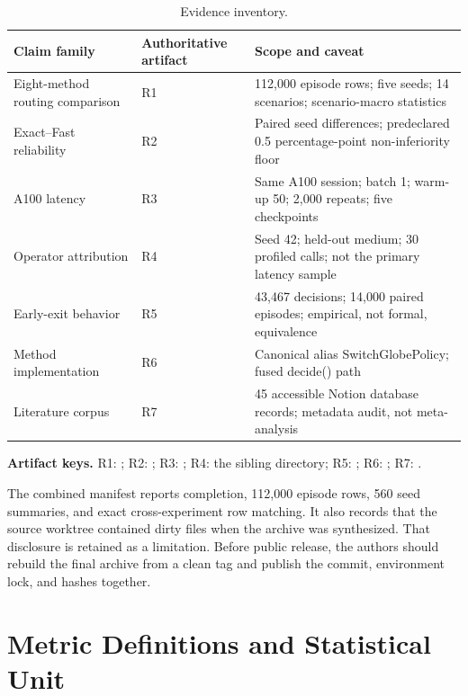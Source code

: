 \documentclass{ieeeaccess}
\begin{document}
\begin{table}[t]
\caption{Evidence inventory.}\label{tab:inventory}\small
\begin{tabularx}{\textwidth}{p{}p{}X}
\toprule
Claim family & Authoritative artifact & Scope and caveat \\
\midrule
Eight-method routing comparison & R1 & 112,000 episode rows; five seeds; 14 scenarios; scenario-macro statistics \\
Exact--Fast reliability & R2 & Paired seed differences; predeclared 0.5 percentage-point non-inferiority floor \\
A100 latency & R3 & Same A100 session; batch 1; warm-up 50; 2,000 repeats; five checkpoints \\
Operator attribution & R4 & Seed 42; held-out medium; 30 profiled calls; not the primary latency sample \\
Early-exit behavior & R5 & 43,467 decisions; 14,000 paired episodes; empirical, not formal, equivalence \\
Method implementation & R6 & Canonical alias SwitchGlobePolicy; fused decide() path \\
Literature corpus & R7 & 45 accessible Notion database records; metadata audit, not meta-analysis \\
\bottomrule
\end{tabularx}
\end{table}

\noindent\textbf{Artifact keys.} R1: ; R2: ; R3: ; R4: the sibling  directory; R5: ; R6: ; R7: .

The combined manifest reports completion, 112,000 episode rows, 560 seed summaries, and exact cross-experiment row matching. It also records that the source worktree contained dirty files when the archive was synthesized. That disclosure is retained as a limitation. Before public release, the authors should rebuild the final archive from a clean tag and publish the commit, environment lock, and hashes together.

\section{Metric Definitions and Statistical Unit}
\end{document}
